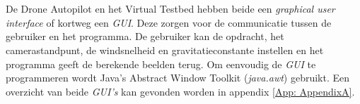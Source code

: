 \\
\\
De Drone Autopilot en het Virtual Testbed hebben beide een \textit{graphical user interface} of kortweg een \textit{GUI}. Deze zorgen voor de communicatie tussen de gebruiker en het programma. De gebruiker kan de opdracht, het camerastandpunt, de windsnelheid en gravitatieconstante instellen en het programma geeft de berekende beelden terug. Om eenvoudig de \textit{GUI} te programmeren wordt Java's Abstract Window Toolkit (\textit{java.awt}) gebruikt. Een overzicht van beide \textit{GUI's} kan gevonden worden in appendix \ref{App: AppendixA}.

